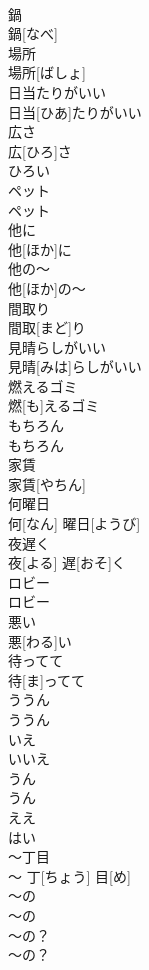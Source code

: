\documentclass[8pt]{extreport}
\begin{document}
\begin{CJK}{UTF8}{min}
\\	鍋	
\\	鍋[なべ]		
\\	場所	
\\	場所[ばしょ]		
\\	日当たりがいい	
\\	日当[ひあ]たりがいい		
\\	広さ	
\\	広[ひろ]さ	
\\	ひろい 
\\	ペット	
\\	ペット		
\\	他に	
\\	他[ほか]に		
\\	他の〜	
\\	他[ほか]の〜		
\\	間取り	
\\	間取[まど]り		
\\	見晴らしがいい	
\\	見晴[みは]らしがいい		
\\	燃えるゴミ	
\\	燃[も]えるゴミ		
\\	もちろん	
\\	もちろん		
\\	家賃	
\\	家賃[やちん]		
\\	何曜日	
\\	何[なん] 曜日[ようび]		
\\	夜遅く	
\\	夜[よる] 遅[おそ]く		
\\	ロビー	
\\	ロビー		
\\	悪い	
\\	悪[わる]い		
\\	待ってて	
\\	待[ま]ってて		
\\	ううん	
\\	ううん	
\\	いえ 
\\	いいえ 
\\	うん	
\\	うん	
\\	ええ 
\\	はい 
\\	〜丁目	
\\	〜 丁[ちょう] 目[め]		
\\	〜の	
\\	〜の		
\\	〜の？	
\\	〜の？		

\end{CJK}
\end{document}
